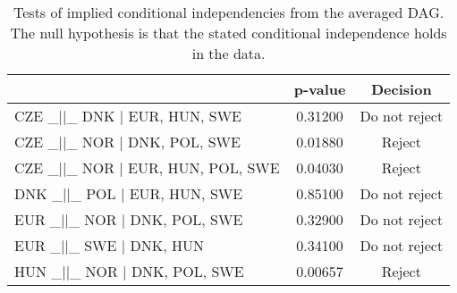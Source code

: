 \begin{table}[!h]
\centering
\caption{Tests of implied conditional independencies from the averaged DAG. 
  The null hypothesis is that the stated conditional independence holds in the data.}
\centering
\begin{tabular}[t]{lcc}
\toprule
  & p-value & Decision\\
\midrule
CZE _||_ DNK | EUR, HUN, SWE & 0.31200 & Do not reject\\
CZE _||_ NOR | DNK, POL, SWE & 0.01880 & Reject\\
CZE _||_ NOR | EUR, HUN, POL, SWE & 0.04030 & Reject\\
DNK _||_ POL | EUR, HUN, SWE & 0.85100 & Do not reject\\
EUR _||_ NOR | DNK, POL, SWE & 0.32900 & Do not reject\\
\addlinespace
EUR _||_ SWE | DNK, HUN & 0.34100 & Do not reject\\
HUN _||_ NOR | DNK, POL, SWE & 0.00657 & Reject\\
\bottomrule
\end{tabular}
\end{table}
